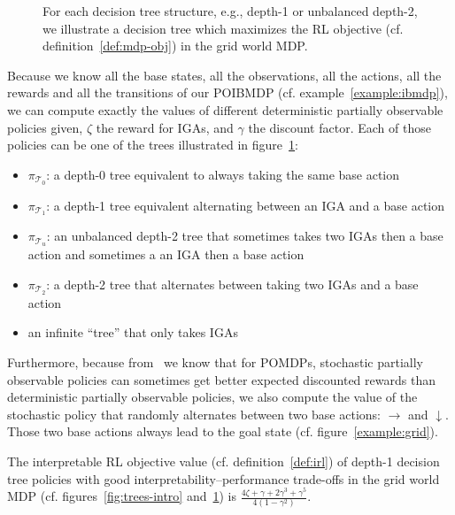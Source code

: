 \begin{figure}
    \caption{For each decision tree structure, e.g., depth-1 or unbalanced depth-2, we illustrate a decision tree which maximizes the RL objective (cf. definition~\ref{def:mdp-obj}) in the grid world MDP.}
    \label{fig:optimal-policy-trees}
\end{figure}

Because we know all the base states, all the observations, all the actions, all the rewards and all the transitions of our POIBMDP (cf. example~\ref{example:ibmdp}), we can compute exactly the values of different deterministic partially observable policies given, $\zeta$ the reward for IGAs, and $\gamma$ the discount factor.
Each of those policies can be one of the trees illustrated in figure~\ref{fig:optimal-policy-trees}: 

\begin{itemize}
    \item $\pi_{\mathcal{T}_0}$: a depth-0 tree equivalent to always taking the same base action 
    \item $\pi_{\mathcal{T}_1}$: a depth-1 tree equivalent alternating between an IGA and a base action 
    \item $\pi_{\mathcal{T}_u}$: an unbalanced depth-2 tree that sometimes takes two IGAs then a base action and sometimes a an IGA then a base action
    \item $\pi_{\mathcal{T}_2}$: a depth-2 tree that alternates between taking two IGAs and a base action
    \item an infinite ``tree'' that only takes IGAs
\end{itemize}
Furthermore, because from~\cite{learning-pomdp} we know that for POMDPs, stochastic partially observable policies can sometimes get better expected discounted rewards than deterministic partially observable policies, we also compute the value of the stochastic policy that randomly alternates between two base actions: $\rightarrow$ and $\downarrow$.
Those two base actions always lead to the goal state (cf. figure~\ref{example:grid}).

\begin{proposition} The interpretable RL objective value (cf. definition~\ref{def:irl}) of depth-1 decision tree policies with good interpretability–performance trade-offs in the grid world MDP (cf. figures~\ref{fig:trees-intro} and~\ref{fig:optimal-policy-trees}) is $\frac{4\zeta + \gamma + 2\gamma^3 + \gamma^5}{4(1-\gamma^2)}$.
\end{proposition}

